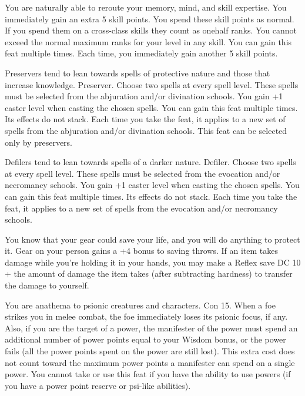 {You are naturally able to reroute your memory, mind, and skill expertise.}{}
{You immediately gain an extra 5 skill points. You spend these skill points as normal. If you spend them on a cross-class skills they count as onehalf ranks. You cannot exceed the normal maximum ranks for your level in any skill.}{}
{You can gain this feat multiple times. Each time, you immediately gain another 5 skill points.}

{Preservers tend to lean towards spells of protective nature and those that increase knowledge.}
{Preserver.}
{Choose two spells at every spell level. These spells must be selected from the abjuration and/or divination schools. You gain +1 caster level when casting the chosen spells.}{}
{You can gain this feat multiple times. Its effects do not stack. Each time you take the feat, it applies to a new set of spells from the abjuration and/or divination schools.
This feat can be selected only by preservers.}

{Defilers tend to lean towards spells of a darker nature.}
{Defiler.}
{Choose two spells at every spell level. These spells must be selected from the evocation and/or necromancy schools. You gain +1 caster level when casting the chosen spells.}{}
{You can gain this feat multiple times. Its effects do not stack. Each time you take the feat, it applies to a new set of spells from the evocation and/or necromancy schools.}

{You know that your gear could save your life, and you will do anything to protect it.}{}
{Gear on your person gains a +4 bonus to saving throws. If an item takes damage while you're holding it in your hands, you may make a Reflex save DC 10 + the amount of damage the item takes (after subtracting hardness) to transfer the damage to yourself.}{}{}

{You are anathema to psionic creatures and characters.}
{Con 15.}
{When a foe strikes you in melee combat, the foe immediately loses its psionic focus, if any. Also, if you are the target of a power, the manifester of the power must spend an additional number of power points equal to your Wisdom bonus, or the power fails (all the power points spent on the power are still lost). This extra cost does not count toward the maximum power points a manifester can spend on a single power.}{}
{You cannot take or use this feat if you have the ability to use powers (if you have a power point reserve or psi-like abilities).}

